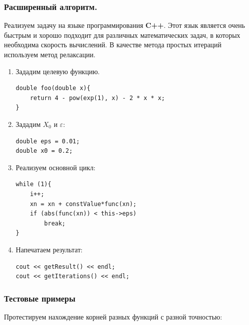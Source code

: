 \documentclass{article}
\begin{document}
				\subsubsection{Расширенный алгоритм.}
			
			Реализуем задачу на языке программирования \textbf{C++}. Этот язык является очень быстрым и хорошо подходит для различных математических задач, в которых необходима скорость вычислений. В качестве метода простых итераций используем метод релаксации.
			
			\begin{enumerate}
					\item Зададим целевую функцию.			
					\lstset {language=C++}
					\begin{lstlisting}
double foo(double x){
	return 4 - pow(exp(1), x) - 2 * x * x; 
}

					\end{lstlisting}
					
					\item Зададим $X_0$ и $\varepsilon$:
					\begin{lstlisting}
double eps = 0.01;
double x0 = 0.2;
					\end{lstlisting}
					
					\item Реализуем основной цикл:
					\begin{lstlisting}
while (1){
	i++;
	xn = xn + constValue*func(xn);
	if (abs(func(xn)) < this->eps) 
		break;
}
					\end{lstlisting}
					
					\item Напечатаем результат:
					\begin{lstlisting}
cout << getResult() << endl;
cout << getIterations() << endl;
					\end{lstlisting}					
					
				
				\end{enumerate}
				
				\subsubsection{Тестовые примеры}
			
			Протестируем нахождение корней разных функций с разной точностью:\\
			
\end{document}
